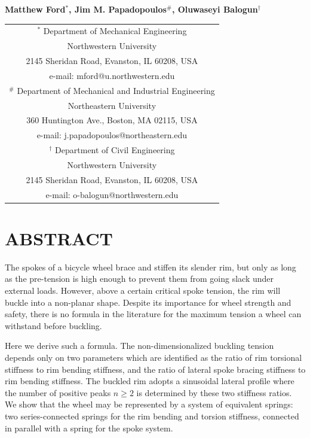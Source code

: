 \documentclass{bmd2016p}
\begin{document}
\begin{center}
\end{center}

\begin{center}
\normalsize{\bf{Matthew Ford$^{*}$, Jim M. Papadopoulos$^\#$, 
            Oluwaseyi Balogun$^\dag$}}
\end{center} 

\begin{center}
\begin{tabular}{c}
$^*$ Department of Mechanical Engineering\\
Northwestern University\\
2145 Sheridan Road, Evanston, IL 60208, USA\\
e-mail: mford@u.northwestern.edu\\[2.5ex]

$^\#$ Department of Mechanical and Industrial Engineering\\
Northeastern University\\
360 Huntington Ave., Boston, MA 02115, USA\\
e-mail: j.papadopoulos@northeastern.edu\\[2.5ex]

$^\dag$ Department of Civil Engineering\\
Northwestern University\\
2145 Sheridan Road, Evanston, IL 60208, USA\\
e-mail: o-balogun@northwestern.edu\\
\end{tabular}
\end{center}

\section*{ABSTRACT}
The spokes of a bicycle wheel brace and stiffen its slender rim, but only as long as the pre-tension is high enough to prevent them from going slack under external loads. However, above a certain critical spoke tension, the rim will buckle into a non-planar shape. Despite its importance for wheel strength and safety, there is no formula in the literature for the maximum tension a wheel can withstand before buckling.

Here we derive such a formula. The non-dimensionalized buckling tension depends only on two parameters which are identified as the ratio of rim torsional stiffness to rim bending stiffness, and the ratio of lateral spoke bracing stiffness to rim bending stiffness. The buckled rim adopts a sinusoidal lateral profile where the number of positive peaks $n\geq 2$ is determined by these two stiffness ratios. We show that the wheel may be represented by a system of equivalent springs: two series-connected springs for the rim bending and torsion stiffness, connected in parallel with a spring for the spoke system.
\end{document}
